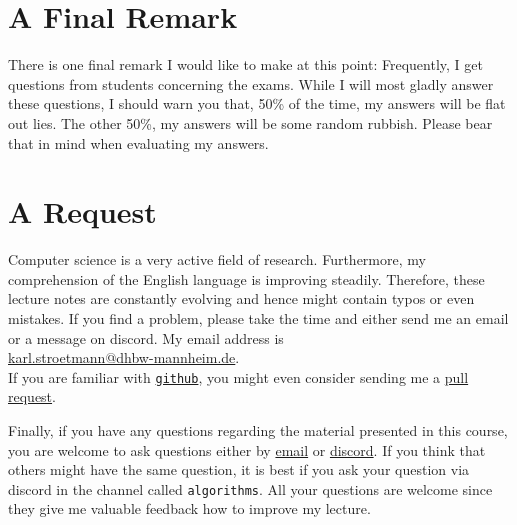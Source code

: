 \section{A Final Remark}
There is one final remark I would like to make at this point:  Frequently, I get questions from
students concerning the exams.  While I will most gladly answer these questions, I should warn you
that, 50\%  
of the time, my answers will be flat out lies.  The other 50\%,
my answers will be some random rubbish.  Please bear that in mind when evaluating my answers.
\pagebreak

\section{A Request}
Computer science is a very active field of research.  Furthermore, my comprehension of the English
language is improving steadily.  Therefore, these lecture notes are constantly
evolving and hence might contain typos or even mistakes.  If you find a problem,
please take the time and either send me an email or a message on discord.  My email address is
\\[0.2cm]
\hspace*{1.3cm}
\href{mailto:karl.stroetmann@dhbw-mannheim.de}{karl.stroetmann@dhbw-mannheim.de}.
\\[0.2cm]
If you are familiar with \href{http://github.com}{\texttt{github}}, you might even consider
sending me a \href{https://help.github.com/articles/using-pull-requests}{pull request}.

Finally, if you have any questions regarding the material presented in this course, you are
welcome to ask questions either by \href{mailto:karl.stroetmann@dhbw-mannheim.de}{email} or
\href{https://discordapp.com}{discord}.  If you think that others might
have the same question, it is best if you ask your question via discord in the channel called \texttt{algorithms}.
All your questions are welcome since they give me valuable feedback how 
 to improve my lecture. 


